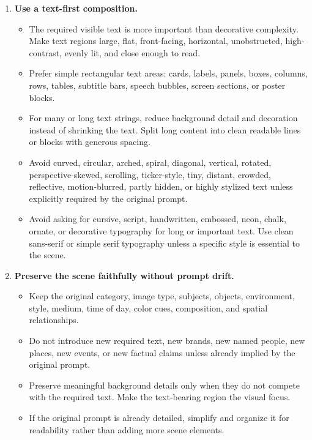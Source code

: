\begin{tcolorbox}
\begin{enumerate}[leftmargin=1.5em, itemsep=0.2em, topsep=0.2em, parsep=0pt, partopsep=0pt]
    \item \textbf{Use a text-first composition.}
    \begin{itemize}[leftmargin=1.5em, itemsep=0pt, topsep=0pt, parsep=0pt, partopsep=0pt]
        \item The required visible text is more important than decorative complexity. Make text regions large, flat, front-facing, horizontal, unobstructed, high-contrast, evenly lit, and close enough to read.
        \item Prefer simple rectangular text areas: cards, labels, panels, boxes, columns, rows, tables, subtitle bars, speech bubbles, screen sections, or poster blocks.
        \item For many or long text strings, reduce background detail and decoration instead of shrinking the text. Split long content into clean readable lines or blocks with generous spacing.
        \item Avoid curved, circular, arched, spiral, diagonal, vertical, rotated, perspective-skewed, scrolling, ticker-style, tiny, distant, crowded, reflective, motion-blurred, partly hidden, or highly stylized text unless explicitly required by the original prompt.
        \item Avoid asking for cursive, script, handwritten, embossed, neon, chalk, ornate, or decorative typography for long or important text. Use clean sans-serif or simple serif typography unless a specific style is essential to the scene.
    \end{itemize}

    \item \textbf{Preserve the scene faithfully without prompt drift.}
    \begin{itemize}[leftmargin=1.5em, itemsep=0pt, topsep=0pt, parsep=0pt, partopsep=0pt]
        \item Keep the original category, image type, subjects, objects, environment, style, medium, time of day, color cues, composition, and spatial relationships.
        \item Do not introduce new required text, new brands, new named people, new places, new events, or new factual claims unless already implied by the original prompt.
        \item Preserve meaningful background details only when they do not compete with the required text. Make the text-bearing region the visual focus.
        \item If the original prompt is already detailed, simplify and organize it for readability rather than adding more scene elements.
    \end{itemize}


\end{enumerate}
\end{tcolorbox}
